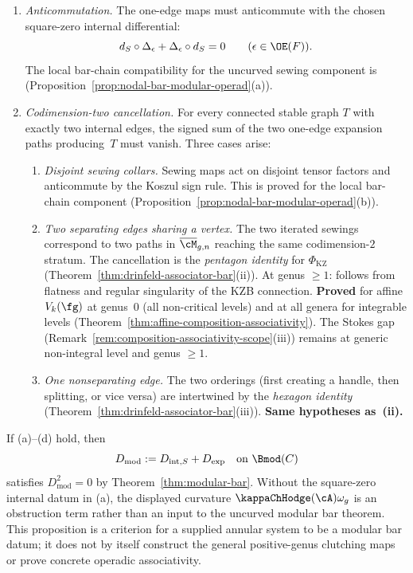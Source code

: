 \begin{proposition}
\begin{enumerate}[label=\textup{(\alph*)}]
\item \emph{Anticommutation.}
 The one-edge maps must anticommute with the chosen square-zero
 internal differential:
 \[
  d_S\circ\Delta_\epsilon+\Delta_\epsilon\circ d_S=0
  \qquad(\epsilon\in\OE(F)).
 \]
 The local bar-chain compatibility for the uncurved sewing component
 is
 \textup{(}Proposition~\textup{\ref{prop:nodal-bar-modular-operad}(a)}\textup{)}.
\item \emph{Codimension-two cancellation.}
 For every connected stable graph $T$ with exactly
 two internal edges, the signed sum of the two
 one-edge expansion paths producing~$T$ must vanish.
 Three cases arise:
 \begin{enumerate}[label=\textup{(\roman*)}]
 \item \emph{Disjoint sewing collars.}
 Sewing maps act on disjoint tensor factors
 and anticommute by the Koszul sign rule.
 This is proved for the local bar-chain component
 \textup{(}Proposition~\textup{\ref{prop:nodal-bar-modular-operad}(b)}\textup{)}.

 \item \emph{Two separating edges sharing a vertex.}
 The two iterated sewings correspond to two
 paths in $\overline{\cM}_{g,n}$ reaching the
 same codimension-$2$ stratum. The cancellation
 is the \emph{pentagon identity} for
 $\Phi_{\mathrm{KZ}}$
 \textup{(}Theorem~\textup{\ref{thm:drinfeld-associator-bar}(ii)}\textup{)}.
 At genus $\ge 1$: follows from flatness and
 regular singularity of the KZB connection.
 \textbf{Proved} for affine $V_k(\fg)$ at
 genus~$0$ \textup{(}all non-critical levels\textup{)}
 and at all genera for integrable levels
 \textup{(}Theorem~\textup{\ref{thm:affine-composition-associativity}}\textup{)}.
 The Stokes gap
 \textup{(}Remark~\textup{\ref{rem:composition-associativity-scope}(iii)}\textup{)}
 remains at generic non-integral level and
 genus $\ge 1$.

 \item \emph{One nonseparating edge.}
 The two orderings (first creating a handle,
 then splitting, or vice versa) are intertwined
 by the \emph{hexagon identity}
 \textup{(}Theorem~\textup{\ref{thm:drinfeld-associator-bar}(iii)}\textup{)}.
 \textbf{Same hypotheses as~(ii).}
 \end{enumerate}
\end{enumerate}
If \textup{(a)--(d)} hold, then
\[
 D_{\mathrm{mod}}
 :=
 D_{\mathrm{int},S}+D_{\mathrm{exp}}
 \quad
 \textup{on }\Bmod(C)
\]
satisfies \(D_{\mathrm{mod}}^2=0\) by
Theorem~\textup{\ref{thm:modular-bar}}.  Without the square-zero
internal datum in \textup{(a)}, the displayed curvature
\(\kappaChHodge(\cA)\omega_g\) is an obstruction term rather than an
input to the uncurved modular bar theorem.  This proposition is a
criterion for a supplied annular system to be a modular bar datum; it
does not by itself construct the general positive-genus clutching maps
or prove concrete operadic associativity.
\end{proposition}

